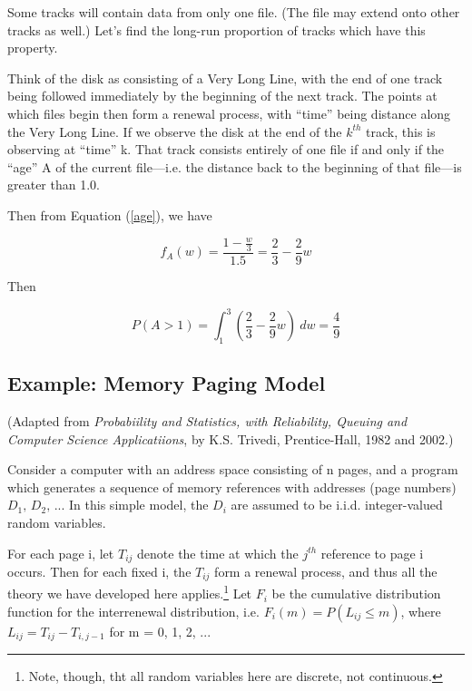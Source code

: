 Some tracks will contain data from only one file.  (The file may extend
onto other tracks as well.)  Let's find the long-run proportion of
tracks which have this property.  

Think of the disk as consisting of a Very Long Line, with the
end of one track being followed immediately by the beginning of the next
track.  The points at which files begin then form a renewal process,
with ``time'' being distance along the Very Long Line.  If we observe
the disk at the end of the $k^{th}$ track, this is observing at ``time''
k.  That track consists entirely of one file if and only if the ``age''
A of the current file---i.e. the distance back to the beginning of that
file---is greater than 1.0.

Then from Equation (\ref{age}), we have

\begin{equation}
f_A(w) = \frac{1-\frac{w}{3}}{1.5} = \frac{2}{3} - \frac{2}{9} w
\end{equation}

Then

\begin{equation}
P(A > 1) = \int_{1}^{3} \left (\frac{2}{3} - \frac{2}{9} w \right) ~ dw
= \frac{4}{9}
\end{equation}

\subsection{Example: Memory Paging Model}
\label{mem} 

(Adapted from \textit{Probabiility and Statistics, with Reliability, Queuing
and Computer Science Applicatiions}, by K.S. Trivedi, Prentice-Hall,
1982 and 2002.)

Consider a computer with an address space consisting of n pages, and a program
which generates a sequence of memory references with addresses (page numbers)
$D_{1},\, D_{2},\, ...$ In this simple model, the $D_{i}$ are assumed
to be i.i.d. integer-valued random variables.

For each page i, let $T_{ij}$ denote the time at which the $j^{th}$
reference to page i occurs. Then for each fixed i, the $T_{ij}$ form a
renewal process, and thus all the theory we have developed here
applies.\footnote{Note, though, tht all random variables here are
discrete, not continuous.} Let $F_{i}$ be the cumulative distribution
function for the interrenewal distribution, i.e. $F_{i}(m)=P(L_{ij} \leq m)$,
where $L_{ij}=T_{ij}-T_{i,j-1}$ for m = 0, 1, 2, ...

